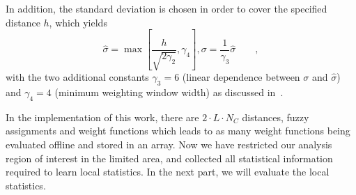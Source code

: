 \documentclass[conference]{IEEEtran}
\begin{document}

In addition, the standard
deviation is chosen in order to cover the specified distance $h$,
which yields 
\begin{equation}
  \label{eq:deviation}
  \hat{\sigma} = \max \left[\frac{h}{\sqrt{2\gamma_2}}, \gamma_4
  \right], \sigma  = \frac{1}{\gamma_3} \hat{\sigma}\qquad,
\end{equation}
with the two additional constants $\gamma_3 = 6$ (linear dependence
between $\sigma$ and $\hat{\sigma}$) and $\gamma_4 = 4$ (minimum
weighting window width) as discussed in~\cite{panin2006efficient}. 

In the implementation of this work,
there are $2 \cdot L \cdot N_C$ distances, fuzzy assignments
and weight functions which leads to as many weight functions being 
evaluated offline and stored in an array. Now we have restricted our analysis region of interest in the
limited area, and collected all statistical information required to learn
local statistics. In the next part, we will evaluate the local
statistics.
\end{document}
